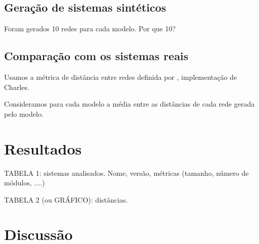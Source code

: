 \documentclass{acm_proc_article-sp}
\begin{document}
\subsection{Geração de sistemas sintéticos}

Foram gerados 10 redes para cada modelo. Por que 10?

\subsection{Comparação com os sistemas reais}

Usamos a métrica de distância entre redes definida por \cite{Andrade2008}, implementação de Charles.

Consideramos para cada modelo a média entre as distâncias de cada rede gerada pelo modelo.


\section{Resultados} %

TABELA 1: sistemas analisados. Nome, versão, métricas (tamanho, número de módulos, ....)

TABELA 2 (ou GRÁFICO): distâncias.


\section{Discussão} %




\end{document}
